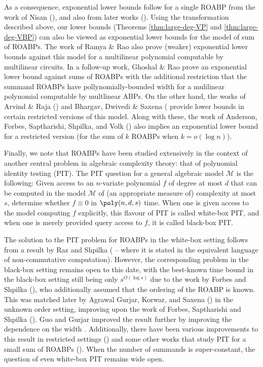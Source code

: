 \documentclass{article}
\begin{document}
As a consequence, exponential lower bounds follow for a single ROABP from the work of Nisan (\cite{Nisan91}), and also from later works (\cite{Jansen08, KayalNS20}). 
Using the  transformation described above, our lower bounds (Theorems \ref{thm:large-deg-VP} and \ref{thm:large-deg-VBP}) can also be viewed as exponential lower bounds for the model of sum of ROABPs. 
The work of Ramya \& Rao \cite{RR20} also prove (weaker) exponential lower bounds against this model for a multilinear polynomial computable by multilinear circuits.
In a follow-up work, Ghoshal \& Rao \cite{GR21} prove an exponential lower bound against sums of ROABPs with the additional restriction that the summand ROABPs have pollynomially-bounded width for a mulilinear polynomial computable by multlinear ABPs.
On the other hand, the works of Arvind \& Raja (\cite{ArvindR16}) and Bhargav, Dwivedi \& Saxena (\cite{BDS23} provide lower bounds in certain restricted versions of this model. 
Along with these, the work of Anderson, Forbes, Saptharishi, Shpilka, and Volk (\cite{AndersonFSSV18}) also implies an exponential lower bound for a restricted version (for the sum of $k$ ROABPs when $k = o(\log n)$).

Finally, we note that ROABPs have been studied extensively in the context of another central problem in algebraic complexity theory: that of  polynomial identity testing (PIT). The PIT question for a general algebraic model $\mathcal{M}$ is the following:
Given access to an $n$-variate polynomial $f$ of degree at most $d$ that can be computed in the model $\mathcal{M}$ of (an appropriate measure of) complexity at most $s$, determine whether $f \equiv 0$ in $\poly(n,d,s)$ time.
When one is given access to the model computing $f$ explicitly, this flavour of PIT is called white-box PIT, and when one is merely provided query access to $f$,  it is called black-box PIT. 

The solution to the PIT problem for ROABPs in the white-box setting
follows from a result by Raz and Shpilka (\cite{RazS05} -- where it is stated in the equivalent language of non-commutative computation). However, the corresponding problem in the black-box setting remains open to this date, with the best-known time bound in the black-box setting still being only $s^{O(\log s)}$ due to the work by Forbes and Shpilka (\cite{ForbesS13}), who additionally assumed that the ordering of the ROABP is known. This was matched later by Agrawal Gurjar, Korwar, and Saxena (\cite{AgrawalGKS15}) in the unknown order setting, improving upon the work of Forbes, Saptharishi and Shpilka (\cite{ForbesSS14}). Guo and Gurjar improved the result further by improving the dependence on the width \cite{guo2020improved}. 
Additionally, there have been various improvements to this result in restricted settings (\cite{GurjarKS17, GurjarV20, BhargavaG22}) and some other works that study PIT for a small sum of ROABPs (\cite{GurjarKST17, BishtS21,guo2020improved}). When the number of summands is super-constant, the question of even white-box PIT remains wide open.
\end{document}
